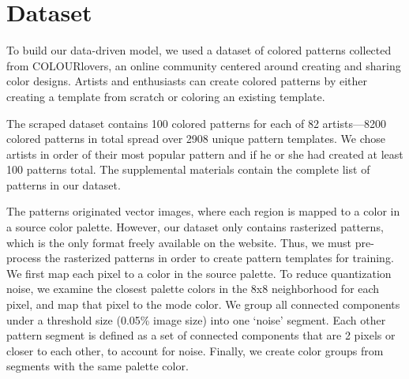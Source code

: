 \section{Dataset}
\label{sec:dataset}

To build our data-driven model, we used a dataset of colored patterns collected from COLOURlovers, an online community centered around creating and sharing color designs. Artists and enthusiasts can create colored patterns by either creating a template from scratch or coloring an existing template. 

The scraped dataset contains 100 colored patterns for each of 82 artists---8200 colored patterns in total spread over 2908 unique pattern templates. We chose artists in order of their most popular pattern and if he or she had created at least 100 patterns total. The supplemental materials contain the complete list of patterns in our dataset.

The patterns originated vector images, where each region is mapped to a color in a source color palette. However, our dataset only contains rasterized patterns, which is the only format freely available on the website. Thus, we must pre-process the rasterized patterns in order to create pattern templates for training. We first map each pixel to a color in the source palette. To reduce quantization noise, we examine the closest palette colors in the 8x8 neighborhood for each pixel, and map that pixel to the mode color. We group all connected components under a threshold size (0.05\% image size) into one `noise' segment. Each other pattern segment is defined as a set of connected components that are 2 pixels or closer to each other, to account for noise. Finally, we create color groups from segments with the same palette color.